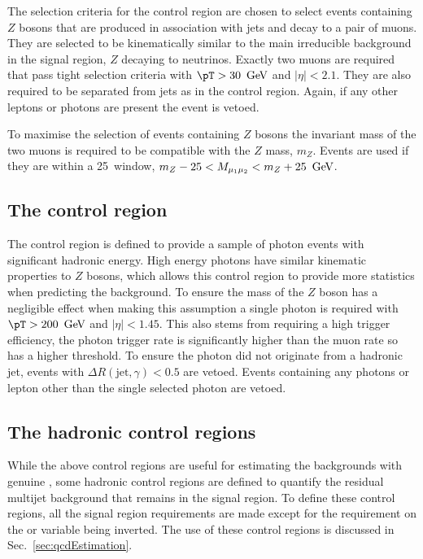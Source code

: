 The selection criteria for the \mmj control region are chosen to
select events containing $Z$ bosons that are produced in association
with jets and decay to a pair of muons. They are selected to be
kinematically similar to the main irreducible background in the signal
region, $Z$ decaying to neutrinos. Exactly two muons are required that
pass tight selection criteria with $\pT>30~\gev$ and $|\eta|<2.1$.
They are also required to be separated from jets as in the \mj control
region. Again, if any other leptons or photons are present the event
is vetoed.

To maximise the selection of events containing $Z$ bosons the
invariant mass of the two muons is required to be compatible with the
$Z$ mass, $m_Z$. Events are used if they are within a 25~\gev window,
$m_Z-25<M_{\mu_1\mu_2}<m_Z+25~\mathrm{\,Ge\kern -0.1em V}$.

\subsection{The \gj control region}

The \gj control region is defined to provide a sample of photon events
with significant hadronic energy. High energy photons have similar
kinematic properties to $Z$ bosons, which allows this control region
to provide more statistics when predicting the \znunu background. To
ensure the mass of the $Z$ boson has a negligible effect when making
this assumption a single photon is required with $\pT>200~\gev$ and
$|\eta|<1.45$. This also stems from requiring a high trigger
efficiency, the photon trigger rate is significantly higher than the
muon rate so has a higher threshold. To ensure the photon did not
originate from a hadronic jet, events with $\Delta
R(\mathrm{jet},\gamma)<0.5$ are vetoed. Events containing any photons
or lepton other than the single selected photon are vetoed.

\subsection{The hadronic control regions}

While the above control regions are useful for estimating the \SM
backgrounds with genuine \MET, some hadronic control regions are
defined to quantify the residual \QCD multijet background that remains
in the signal region. To define these control regions, all the signal
region requirements are made except for the requirement on the \bdphi or
\mhtmet variable being inverted. The use of these control regions is
discussed in Sec.~\ref{sec:qcdEstimation}.


